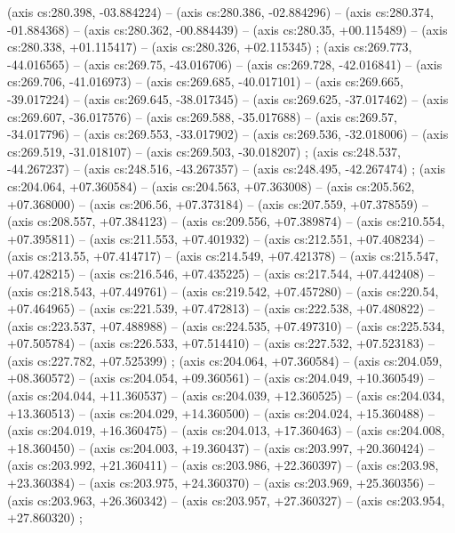     (axis cs:280.398,    -03.884224) --  (axis cs:280.386,    -02.884296) --  (axis cs:280.374,    -01.884368) --  (axis cs:280.362,    -00.884439) --  (axis cs:280.35,    +00.115489) --  (axis cs:280.338,    +01.115417) --  (axis cs:280.326,    +02.115345) ;
    (axis cs:269.773,    -44.016565) --  (axis cs:269.75,    -43.016706) --  (axis cs:269.728,    -42.016841) --  (axis cs:269.706,    -41.016973) --  (axis cs:269.685,    -40.017101) --  (axis cs:269.665,    -39.017224) --  (axis cs:269.645,    -38.017345) --  (axis cs:269.625,    -37.017462) --  (axis cs:269.607,    -36.017576) --  (axis cs:269.588,    -35.017688) --  (axis cs:269.57,    -34.017796) --  (axis cs:269.553,    -33.017902) --  (axis cs:269.536,    -32.018006) --  (axis cs:269.519,    -31.018107) --  (axis cs:269.503,    -30.018207) ;
    (axis cs:248.537,    -44.267237) --  (axis cs:248.516,    -43.267357) --  (axis cs:248.495,    -42.267474) ;
    (axis cs:204.064,    +07.360584) --  (axis cs:204.563,    +07.363008) --  (axis cs:205.562,    +07.368000) --  (axis cs:206.56,    +07.373184) --  (axis cs:207.559,    +07.378559) --  (axis cs:208.557,    +07.384123) --  (axis cs:209.556,    +07.389874) --  (axis cs:210.554,    +07.395811) --  (axis cs:211.553,    +07.401932) --  (axis cs:212.551,    +07.408234) --  (axis cs:213.55,    +07.414717) --  (axis cs:214.549,    +07.421378) --  (axis cs:215.547,    +07.428215) --  (axis cs:216.546,    +07.435225) --  (axis cs:217.544,    +07.442408) --  (axis cs:218.543,    +07.449761) --  (axis cs:219.542,    +07.457280) --  (axis cs:220.54,    +07.464965) --  (axis cs:221.539,    +07.472813) --  (axis cs:222.538,    +07.480822) --  (axis cs:223.537,    +07.488988) --  (axis cs:224.535,    +07.497310) --  (axis cs:225.534,    +07.505784) --  (axis cs:226.533,    +07.514410) --  (axis cs:227.532,    +07.523183) --  (axis cs:227.782,    +07.525399) ;
    (axis cs:204.064,    +07.360584) --  (axis cs:204.059,    +08.360572) --  (axis cs:204.054,    +09.360561) --  (axis cs:204.049,    +10.360549) --  (axis cs:204.044,    +11.360537) --  (axis cs:204.039,    +12.360525) --  (axis cs:204.034,    +13.360513) --  (axis cs:204.029,    +14.360500) --  (axis cs:204.024,    +15.360488) --  (axis cs:204.019,    +16.360475) --  (axis cs:204.013,    +17.360463) --  (axis cs:204.008,    +18.360450) --  (axis cs:204.003,    +19.360437) --  (axis cs:203.997,    +20.360424) --  (axis cs:203.992,    +21.360411) --  (axis cs:203.986,    +22.360397) --  (axis cs:203.98,    +23.360384) --  (axis cs:203.975,    +24.360370) --  (axis cs:203.969,    +25.360356) --  (axis cs:203.963,    +26.360342) --  (axis cs:203.957,    +27.360327) --  (axis cs:203.954,    +27.860320) ;
